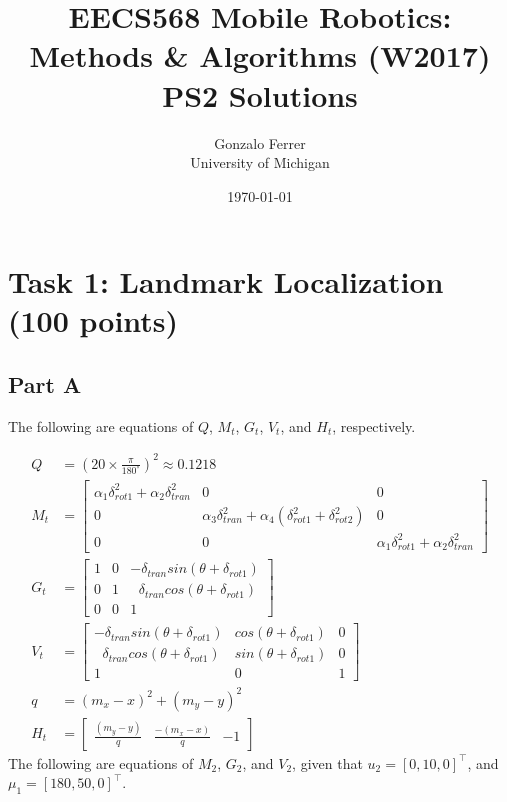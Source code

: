 \documentclass[11pt, oneside, letterpaper]{article}
\begin{document}
\title{\huge\textbf{EECS568 Mobile Robotics: Methods \& Algorithms (W2017) PS2 Solutions}}
\author{Gonzalo Ferrer\\University of Michigan}
\date{\today}
\maketitle

\section*{Task 1: Landmark Localization (100 points)}

\subsection*{Part A}

The following are equations of $Q$, $M_t$, $G_t$, $V_t$, and $H_t$, respectively.

\begin{equation*}
\label{eqn:TimeStepT}
\begin{aligned}
Q &= \left(20 \times \frac{\pi}{180^{\circ}}\right)^2 \approx 0.1218 \\
M_t &= \begin{bmatrix}
\alpha_1 \delta_{rot1}^{2} + \alpha_2 \delta_{tran}^{2} & 0 & 0 \\
0 & \alpha_3 \delta_{tran}^{2} + \alpha_4 (\delta_{rot1}^{2} + \delta_{rot2}^{2}) & 0 \\
0 & 0 & \alpha_1 \delta_{rot1}^{2} + \alpha_2 \delta_{tran}^{2}
\end{bmatrix} \\
G_t &= \begin{bmatrix}
1 & 0 & -\delta_{tran}sin(\theta + \delta_{rot1}) \\
0 & 1 & \ \ \, \delta_{tran}cos(\theta + \delta_{rot1}) \\
0 & 0 & 1
\end{bmatrix} \\
V_t &= \begin{bmatrix}
-\delta_{tran}sin(\theta + \delta_{rot1}) & cos(\theta + \delta_{rot1}) & 0  \\
\ \ \, \delta_{tran}cos(\theta + \delta_{rot1}) & sin(\theta + \delta_{rot1}) & 0 \\
1 & 0 & 1
\end{bmatrix} \\
q &= (m_x - x)^2 + (m_y - y)^2 \\
H_t &= \begin{bmatrix}
\frac{(m_y - y)}{q} & \frac{-(m_x - x)}{q} & -1
\end{bmatrix}
\end{aligned}
\end{equation*}
The following are equations of $M_2$, $G_2$, and $V_2$, given that $u_2 = [0, 10, 0]^\top$, and $\mu_1 = [180, 50, 0]^\top$.
\end{document}
